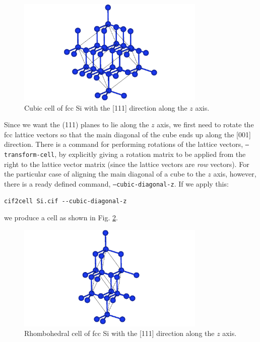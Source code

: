 \documentclass[11pt]{article}
\begin{document}
\begin{figure}[htbp] %
   \centering
   \includegraphics[width=0.8\textwidth]{Si_tilt.pdf} 
   \caption{Cubic cell of fcc Si with the [111] direction along the $z$ axis.}
   \label{tiltSi}
\end{figure}

Since we want the (111) planes to lie along the $z$ axis, we first need to rotate the fcc lattice vectors so that the main diagonal of the cube ends up along the [001] direction. There is a command for performing rotations of the lattice vectors, \texttt{--transform-cell}, by explicitly giving a rotation matrix to be applied from the right to the lattice vector matrix (since the lattice vectors are \emph{row} vectors). For the particular case of aligning the main diagonal of a cube to the $z$ axis, however, there is a ready defined command, \texttt{--cubic-diagonal-z}. If we apply this:
\begin{Verbatim}[fontsize=\footnotesize]
cif2cell Si.cif --cubic-diagonal-z
\end{Verbatim}
we produce a cell as shown in Fig. \ref{rhombSi}.

\begin{figure}[htbp] %
   \centering
   \includegraphics[width=0.8\textwidth]{Si_rhomb.pdf} 
   \caption{Rhombohedral cell of fcc Si with the [111] direction along the $z$ axis.}
   \label{rhombSi}
\end{figure}
\end{document}

